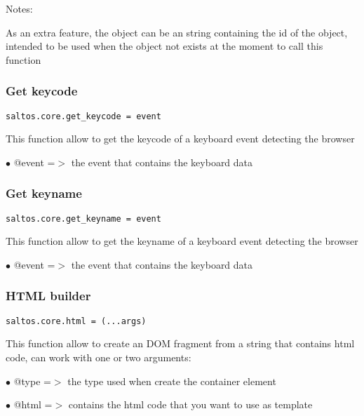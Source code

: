 \documentclass[a4paper]{article}
\begin{document}
Notes:

As an extra feature, the object can be an string containing the id of the object, intended
to be used when the object not exists at the moment to call this function

\hypertarget{toc699}{}
\subsubsection{Get keycode}

\begin{lstlisting}
saltos.core.get_keycode = event
\end{lstlisting}

This function allow to get the keycode of a keyboard event detecting the browser

\begin{compactitem}
\item[\color{myblue}$\bullet$] @event =$>$ the event that contains the keyboard data
\end{compactitem}

\hypertarget{toc700}{}
\subsubsection{Get keyname}

\begin{lstlisting}
saltos.core.get_keyname = event
\end{lstlisting}

This function allow to get the keyname of a keyboard event detecting the browser

\begin{compactitem}
\item[\color{myblue}$\bullet$] @event =$>$ the event that contains the keyboard data
\end{compactitem}

\hypertarget{toc701}{}
\subsubsection{HTML builder}

\begin{lstlisting}
saltos.core.html = (...args)
\end{lstlisting}

This function allow to create an DOM fragment from a string that contains html code, can
work with one or two arguments:

\begin{compactitem}
\item[\color{myblue}$\bullet$] @type =$>$ the type used when create the container element
\item[\color{myblue}$\bullet$] @html =$>$ contains the html code that you want to use as template
\end{compactitem}
\end{document}
